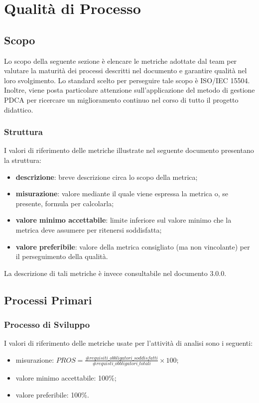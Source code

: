 \section{Qualità di Processo}

\subsection{Scopo}
Lo scopo della seguente sezione è elencare le metriche adottate dal team \Gruppo{} per valutare la maturità dei processi descritti nel documento \textit{\NdP} e garantire qualità nel loro svolgimento. Lo standard scelto per perseguire tale scopo è ISO/IEC 15504. Inoltre, viene posta particolare attenzione sull'applicazione del metodo di gestione PDCA per ricercare un miglioramento continuo nel corso di tutto il progetto didattico.

\subsubsection{Struttura}
I valori di riferimento delle metriche illustrate nel seguente documento presentano la struttura:
\begin{itemize}
	\item{\textbf{descrizione}: breve descrizione circa lo scopo della metrica;}
	\item{\textbf{misurazione}: valore mediante il quale viene espressa la metrica o, se presente, formula per calcolarla;}
	\item{\textbf{valore minimo accettabile}: limite inferiore sul valore minimo che la metrica deve assumere per ritenersi soddisfatta;}
	\item{\textbf{valore preferibile}: valore della metrica consigliato (ma non vincolante) per il perseguimento della qualità.}
\end{itemize}
La descrizione di tali metriche è invece consultabile nel documento \NdP{} 3.0.0.

\subsection{Processi Primari}

	\subsubsection{Processo di Sviluppo}
	
		I valori di riferimento delle metriche usate per l'attività di analisi sono i seguenti:
				\begin{itemize}
					\item{misurazione: $PROS = \displaystyle\frac{\#requisiti\_obbligatori\_soddisfatti}{\#requisti\_obbligatori\_totali} \times 100$;}
					\item{valore minimo accettabile: 100\%;}
					\item{valore preferibile: 100\%.}
				\end{itemize}

